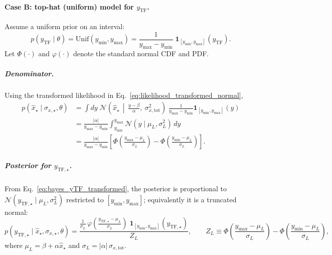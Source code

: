 \paragraph{Case B: top-hat (uniform) model for $y_{\mathrm{TF}}$.}
Assume a uniform prior on an interval:
\begin{equation}
p(y_{\mathrm{TF}}\mid\theta)
=
\mathrm{Unif}(y_{\min},y_{\max})
=
\frac{1}{y_{\max}-y_{\min}}\;\mathbf 1_{[y_{\min},y_{\max}]}(y_{\mathrm{TF}}).
\end{equation}
Let $\Phi(\cdot)$ and $\varphi(\cdot)$ denote the standard normal CDF and PDF.

\subparagraph{Denominator.}
Using the transformed likelihood in Eq.~\eqref{eq:likelihood_transformed_normal},
\begin{align}
p\!\left(\hat x_\star\mid \sigma_{x,\star},\theta\right)
&=
\int dy\;
\mathcal N\!\left(\hat x_\star \,\middle|\, \frac{y-\beta}{\alpha},\ \sigma_{x,\mathrm{tot}}^2\right)\;
\frac{1}{y_{\max}-y_{\min}}\mathbf 1_{[y_{\min},y_{\max}]}(y)
\nonumber\\
&=
\frac{|\alpha|}{y_{\max}-y_{\min}}
\int_{y_{\min}}^{y_{\max}}
\mathcal N\!\left(y \mid \mu_L,\sigma_L^2\right)\,dy
\nonumber\\
&=
\frac{|\alpha|}{y_{\max}-y_{\min}}
\left[
\Phi\!\left(\frac{y_{\max}-\mu_L}{\sigma_L}\right)
-
\Phi\!\left(\frac{y_{\min}-\mu_L}{\sigma_L}\right)
\right].
\label{eq:denom_tophat}
\end{align}

\subparagraph{Posterior for $y_{\mathrm{TF},\star}$.}
From Eq.~\eqref{eq:bayes_yTF_transformed}, the posterior is proportional to
$\mathcal N(y_{\mathrm{TF},\star}\mid \mu_L,\sigma_L^2)$ restricted to $[y_{\min},y_{\max}]$; equivalently it
is a truncated normal:
\begin{equation}
p\!\left(y_{\mathrm{TF},\star}\mid \hat x_\star,\sigma_{x,\star},\theta\right)
=
\frac{
\frac{1}{\sigma_L}\,
\varphi\!\left(\frac{y_{\mathrm{TF},\star}-\mu_L}{\sigma_L}\right)\;
\mathbf 1_{[y_{\min},y_{\max}]}(y_{\mathrm{TF},\star})
}{
Z_L
},
\qquad
Z_L \equiv
\Phi\!\left(\frac{y_{\max}-\mu_L}{\sigma_L}\right)
-
\Phi\!\left(\frac{y_{\min}-\mu_L}{\sigma_L}\right),
\label{eq:post_yTF_tophat}
\end{equation}
where $\mu_L=\beta+\alpha\hat x_\star$ and $\sigma_L=|\alpha|\,\sigma_{x,\mathrm{tot}}$.

